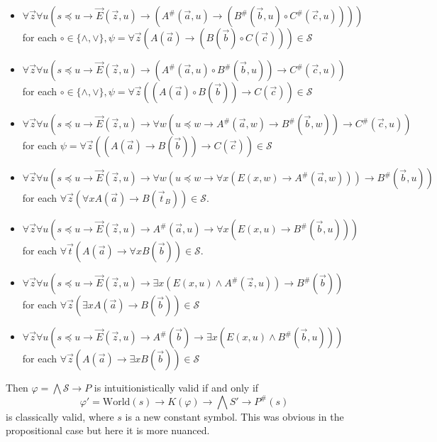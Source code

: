 \documentclass[a4paper,12pt]{report}
\theoremstyle{definition}
\theoremstyle{definition}
\theoremstyle{definition}
\theoremstyle{definition}
\theoremstyle{definition}
\theoremstyle{definition}
\theoremstyle{definition}
\begin{document}
	\begin{itemize}
		\item $\forall \vec z\forall u(s\preceq u\to \vec E(\vec z, u)\to (A^\#(\vec a, u)\to (B^\#(\vec b, u)\circ C^\#(\vec c, u))))$\\for each $\circ\in\{\wedge, \vee\}, \psi = \forall \vec z(A(\vec a)\to (B(\vec b)\circ C(\vec c)))\in\mathcal S$
		\item $\forall \vec z\forall u(s\preceq u\to\vec E(\vec z, u)\to (A^\#(\vec a, u)\circ B^\#(\vec b, u))\to C^\#(\vec c, u))$\\for each $\circ\in\{\wedge, \vee\}, \psi = \forall \vec z((A(\vec a)\circ B(\vec b))\to C(\vec c))\in\mathcal S$
		\item $\forall \vec z\forall u(s\preceq u\to\vec E(\vec z, u)\to\forall w(u\preceq w\to A^\#(\vec a, w)\to B^\#(\vec b, w))\to C^\#(\vec c, u))$\\ for each $\psi = \forall \vec z((A(\vec a)\to B(\vec b))\to C(\vec c))\in\mathcal S$
		\item  $\forall \vec z\forall u(s\preceq u\to\vec E(\vec z, u)\to \forall w(u\preceq w\to \forall x(E(x, w)\to A^\#(\vec a, w)))\to B^\#(\vec b, u))$\\for each $\forall \vec z(\forall xA(\vec a)\to B(\vec t_B))\in\mathcal S$.
		\item $\forall \vec z\forall u(s\preceq u\to\vec E(\vec z, u)\to A^\#(\vec a, u)\to \forall x(E(x, u)\to B^\#(\vec b, u)))$\\for each $\forall \vec t(A(\vec a)\to \forall xB(\vec b))\in\mathcal S$.
		\item $\forall \vec z\forall u(s\preceq u\to\vec E(\vec z, u)\to \exists x(E(x, u)\wedge A^\#(\vec z, u))\to B^\#(\vec b))$\\for each $\forall \vec z(\exists xA(\vec a)\to B(\vec b))\in\mathcal S$
		\item $\forall \vec z\forall u(s\preceq u\to\vec E(\vec z, u)\to A^\#(\vec b)\to \exists x(E(x, u)\wedge B^\#(\vec b, u)))$\\for each $\forall \vec z(A(\vec a)\to \exists xB(\vec b))\in\mathcal S$
	\end{itemize}
	
	Then $\varphi = \bigwedge\mathcal S\to P$ is intuitionistically valid if and only if
	$$\varphi' = \text{World}(s)\to K(\varphi)\to \bigwedge S'\to P^\#(s)$$
	is classically valid, where $s$ is a new constant symbol. This was obvious in the propositional case but here it is more nuanced.
	
\end{document}
